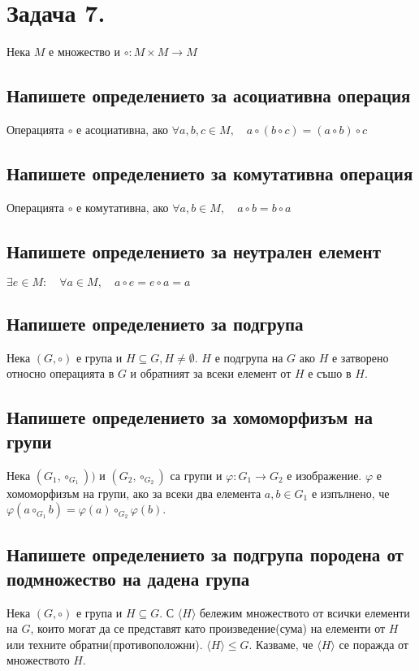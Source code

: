 \documentclass[10pt]{article}
\begin{document}
\section*{Задача 7.}
Нека $M$ е множество и $\circ: M \times M \to M$

\subsection*{Напишете определението за асоциативна операция}
Операцията $\circ$ е асоциативна, ако $\forall a, b, c \in M, \quad a \circ (b \circ c) = (a \circ b) \circ c$

\subsection*{Напишете определението за комутативна операция}
Операцията $\circ$ е комутативна, ако $\forall a, b \in M, \quad a \circ b = b \circ a$

\subsection*{Напишете определението за неутрален елемент}
$\exists e \in M: \quad \forall a \in M, \quad a \circ e = e \circ a = a$

\subsection*{Напишете определението за подгрупа}
Нека $(G, \circ)$ е група и $H \subseteq G, H \neq \emptyset$. $H$ е подгрупа на $G$ ако $H$ е затворено относно операцията в $G$ и обратният за всеки елемент от $H$ е съшо в $H$.

\subsection*{Напишете определението за хомоморфизъм на групи}
Нека $(G_1, \circ_{G_1}))$ и $(G_2, \circ_{G_2})$ са групи и $\varphi: G_1 \to G_2$ е изображение. $\varphi$ е хомоморфизъм на групи, ако за всеки два елемента $a, b \in G_1$ е изпълнено, че $\varphi(a \circ_{G_1} b) = \varphi(a) \circ_{G_2} \varphi(b)$.

\subsection*{Напишете определението за подгрупа породена от подмножество на дадена група}
Нека $(G, \circ)$ е група и $H \subseteq G$. С $\langle H \rangle$ бележим множеството от всички елементи на $G$, които могат да се представят като произведение(сума) на елементи от $H$ или техните обратни(противоположни). $\langle H \rangle \leq G$. Казваме, че $\langle H \rangle$ се поражда от множеството $H$.
\end{document}
